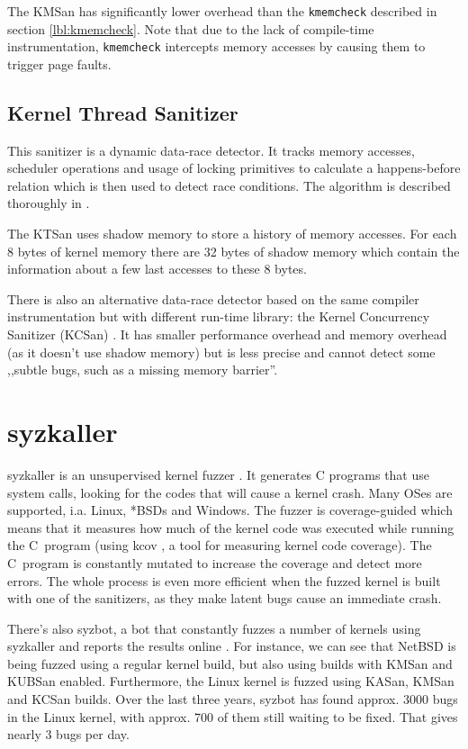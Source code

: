 \documentclass[shortabstract, manyadvisors, english, mgr]{iithesis}
\theoremstyle{definition} \newtheorem*{definition}{Definicja}
\theoremstyle{definition} \newtheorem*{example}{Przykład}
\theoremstyle{definition} \newtheorem*{remark}{Uwaga}
\begin{document}
The KMSan has significantly lower overhead than the \texttt{kmemcheck} described in section \ref{lbl:kmemcheck}. Note that due to the lack of compile-time instrumentation, \texttt{kmemcheck} intercepts memory accesses by causing them to trigger page faults.

\subsection{Kernel Thread Sanitizer}
This sanitizer \cite{bib:google-ktsan} is a dynamic data-race detector. It tracks memory accesses, scheduler operations and usage of locking primitives to calculate a happens-before relation which is then used to detect race conditions. The algorithm is described thoroughly in \cite{bib:tsan-algorithm}.

The KTSan uses shadow memory to store a history of memory accesses. For each 8 bytes of kernel memory there are 32 bytes of shadow memory which contain the information about a few last accesses to these 8 bytes.

There is also an alternative data-race detector based on the same compiler instrumentation but with different run-time library: the Kernel Concurrency Sanitizer (KCSan) \cite{bib:lwn-kcsan}. It has smaller performance overhead and memory overhead (as it doesn't use shadow memory) but is less precise and cannot detect some ,,subtle bugs, such as a missing memory barrier''.

\section{syzkaller}
syzkaller is an unsupervised kernel fuzzer \cite{bib:syzkaller}. It generates C programs that use system calls, looking for the codes that will cause a kernel crash. Many OSes are supported, i.a. Linux, *BSDs and Windows. The fuzzer is coverage-guided which means that it measures how much of the kernel code was executed while running the C~program (using kcov \cite{bib:kcov}, a tool for measuring kernel code coverage). The C~program is constantly mutated to increase the coverage and detect more errors. The whole process is even more efficient when the fuzzed kernel is built with one of the sanitizers, as they make latent bugs cause an immediate crash.

There's also syzbot, a bot that constantly fuzzes a number of kernels using syzkaller and reports the results online \cite{bib:syzbot}. For instance, we can see that NetBSD is being fuzzed using a regular kernel build, but also using builds with KMSan and KUBSan enabled. Furthermore, the Linux kernel is fuzzed using KASan, KMSan and KCSan builds. Over the last three years, syzbot has found approx. 3000 bugs in the Linux kernel, with approx. 700 of them still waiting to be fixed. That gives nearly 3 bugs per day.
\end{document}
